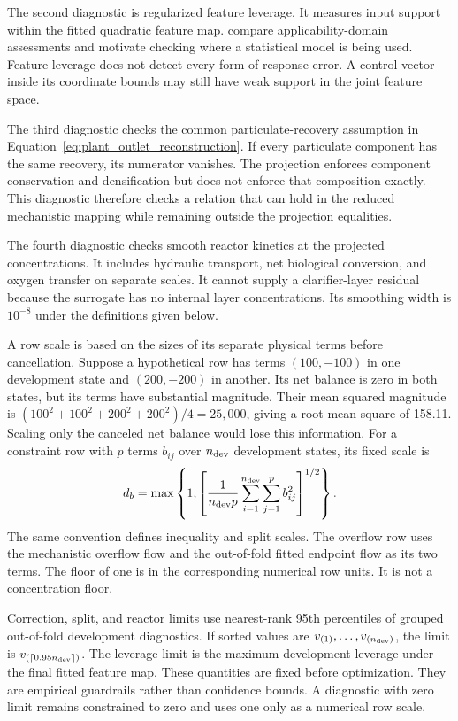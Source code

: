 The second diagnostic is regularized feature leverage. It measures input support within the fitted quadratic feature map. \citet{Sahigara2012} compare applicability-domain assessments and motivate checking where a statistical model is being used. Feature leverage does not detect every form of response error. A control vector inside its coordinate bounds may still have weak support in the joint feature space.

The third diagnostic checks the common particulate-recovery assumption in Equation~\eqref{eq:plant_outlet_reconstruction}. If every particulate component has the same recovery, its numerator vanishes. The projection enforces component conservation and densification but does not enforce that composition exactly. This diagnostic therefore checks a relation that can hold in the reduced mechanistic mapping while remaining outside the projection equalities.

The fourth diagnostic checks smooth reactor kinetics at the projected concentrations. It includes hydraulic transport, net biological conversion, and oxygen transfer on separate scales. It cannot supply a clarifier-layer residual because the surrogate has no internal layer concentrations. Its smoothing width is $10^{-8}$ under the definitions given below.

A row scale is based on the sizes of its separate physical terms before cancellation. Suppose a hypothetical row has terms $(100,-100)$ in one development state and $(200,-200)$ in another. Its net balance is zero in both states, but its terms have substantial magnitude. Their mean squared magnitude is $(100^2+100^2+200^2+200^2)/4=25{,}000$, giving a root mean square of 158.11. Scaling only the canceled net balance would lose this information. For a constraint row with $p$ terms $b_{ij}$ over $n_{\rm dev}$ development states, its fixed scale is
\begin{equation}
d_b=\max\left\{1,\left[\frac1{n_{\rm dev}p}
\sum_{i=1}^{n_{\rm dev}}\sum_{j=1}^{p}b_{ij}^2\right]^{1/2}\right\}.
\label{eq:plant_term_scales}
\end{equation}
The same convention defines inequality and split scales. The overflow row uses the mechanistic overflow flow and the out-of-fold fitted endpoint flow as its two terms. The floor of one is in the corresponding numerical row units. It is not a concentration floor.

Correction, split, and reactor limits use nearest-rank 95th percentiles of grouped out-of-fold development diagnostics. If sorted values are $v_{(1)},\ldots,v_{(n_{\rm dev})}$, the limit is $v_{(\lceil0.95n_{\rm dev}\rceil)}$. The leverage limit is the maximum development leverage under the final fitted feature map. These quantities are fixed before optimization. They are empirical guardrails rather than confidence bounds. A diagnostic with zero limit remains constrained to zero and uses one only as a numerical row scale.

